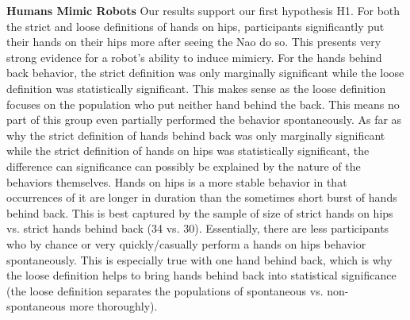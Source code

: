 \documentclass{acm_proc_article-sp}
\begin{document}
\textbf{Humans Mimic Robots} Our results support our first hypothesis H1. For both the strict and loose definitions of hands on hips, participants significantly put their hands on their hips more after seeing the Nao do so. This presents very strong evidence for a robot's ability to induce mimicry. For the hands behind back behavior, the strict definition was only marginally significant while the loose definition was statistically significant. This makes sense as the loose definition focuses on the population who put neither hand behind the back. This means no part of this group even partially performed the behavior spontaneously. As far as why the strict definition of hands behind back was only marginally significant while the strict definition of hands on hips was statistically significant, the difference can significance can possibly be explained by the nature of the behaviors themselves. Hands on hips is a more stable behavior in that occurrences of it are longer in duration than the sometimes short burst of hands behind back. This is best captured by the sample of size of strict hands on hips vs. strict hands behind back (34 vs. 30). Essentially, there are less participants who by chance or very quickly/casually perform a hands on hips behavior spontaneously. This is especially true with one hand behind back, which is why the loose definition helps to bring hands behind back into statistical significance (the loose definition separates the populations of spontaneous vs. non-spontaneous more thoroughly).
\end{document}
